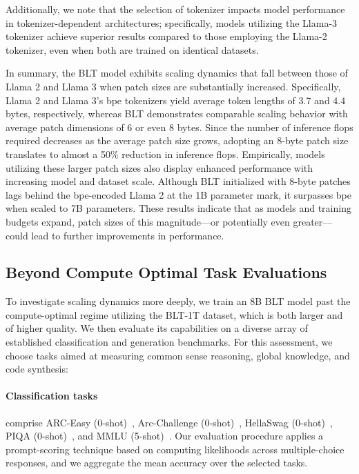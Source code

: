 Additionally, we note that the selection of tokenizer impacts model performance in tokenizer-dependent architectures; specifically, models utilizing the Llama-3 tokenizer achieve superior results compared to those employing the Llama-2 tokenizer, even when both are trained on identical datasets.

In summary, the {\textsc BLT} model exhibits scaling dynamics that fall between those of Llama 2 and Llama 3 when patch sizes are substantially increased. Specifically, Llama 2 and Llama 3’s bpe tokenizers yield average token lengths of 3.7 and 4.4 bytes, respectively, whereas {\textsc BLT} demonstrates comparable scaling behavior with average patch dimensions of 6 or even 8 bytes. Since the number of inference flops required decreases as the average patch size grows, adopting an 8-byte patch size translates to almost a 50\% reduction in inference flops. Empirically, models utilizing these larger patch sizes also display enhanced performance with increasing model and dataset scale. Although {\textsc BLT} initialized with 8-byte patches lags behind the bpe-encoded Llama 2 at the 1B parameter mark, it surpasses bpe when scaled to 7B parameters. These results indicate that as models and training budgets expand, patch sizes of this magnitude—or potentially even greater—could lead to further improvements in performance.

\subsection{Beyond Compute Optimal Task Evaluations}
\label{section:evals}
To investigate scaling dynamics more deeply, we train an 8B {\textsc BLT} model past the compute-optimal regime utilizing the {\textsc BLT}-1T dataset, which is both larger and of higher quality. We then evaluate its capabilities on a diverse array of established classification and generation benchmarks. For this assessment, we choose tasks aimed at measuring common sense reasoning, global knowledge, and code synthesis:
\paragraph{Classification tasks} comprise ARC-Easy (0-shot)~\citep{Eval_ARC}, Arc-Challenge (0-shot)~\citep{Eval_ARC}, HellaSwag (0-shot)~\citep{Eval_hellaswag}, PIQA (0-shot)~\citep{Eval_piqa}, and MMLU (5-shot)~\citep{hendrycks2020measuring}. Our evaluation procedure applies a prompt-scoring technique based on computing likelihoods across multiple-choice responses, and we aggregate the mean accuracy over the selected tasks.
